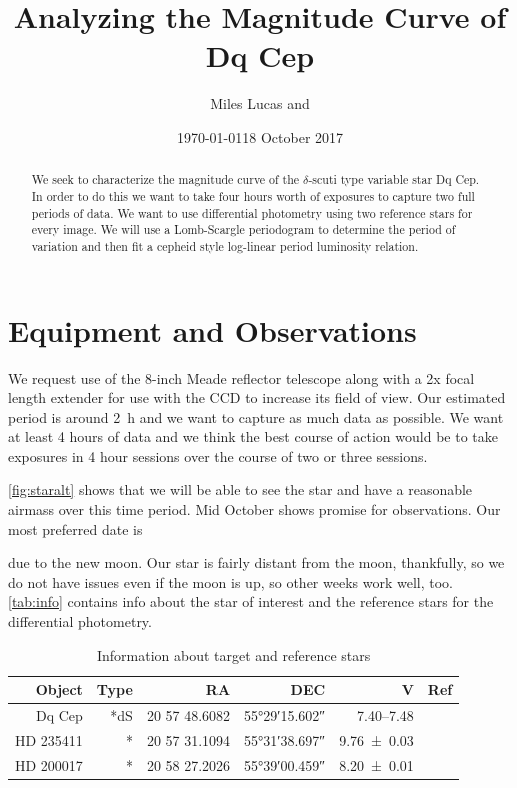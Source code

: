 \documentclass[]{article}
\title{Analyzing the Magnitude Curve of Dq Cep}
\author{Miles Lucas and }
\date{\today}
\begin{document}
\maketitle


\begin{abstract}
	We seek to characterize the magnitude curve of the $\delta$-scuti type variable star Dq Cep. In order to do this we want to take four hours worth of exposures to capture two full periods of data. We want to use differential photometry using two reference stars for every image. We will use a Lomb-Scargle periodogram to determine the period of variation and then fit a cepheid style log-linear period luminosity relation.
\end{abstract}

\section{Equipment and Observations}
	We request use of the 8-inch Meade reflector telescope along with a 2x focal length extender for use with the CCD to increase its field of view. Our estimated period is around \SI{2}{\hour} and we want to capture as much data as possible. We want at least 4 hours of data and we think the best course of action would be to take exposures in 4 hour sessions over the course of two or three sessions. 
	
	\autoref{fig:staralt} shows that we will be able to see the star and have a reasonable airmass over this time period. Mid October shows promise for observations. Our most preferred date is \date{18 October 2017} due to the new moon. Our star is fairly distant from the moon, thankfully, so we do not have issues even if the moon is up, so other weeks work well, too. \autoref{tab:info} contains info about the star of interest and the reference stars for the differential photometry.
	\begin{table}[]
		\centering
		\caption{Information about target and reference stars}
		\begin{tabular}{rrrrrr}
			\hline
			Object & Type &            RA &                DEC &                      V &                        Ref \\ \hline\hline
			Dq Cep &  *dS & 20 57 48.6082 & \ang{55;29;15.602} & \SIrange{7.40}{7.48}{} & \autocite{1971GCVS3.C......0K} \\
			HD 235411 &    * & 20 57 31.1094 & \ang{55;31;38.697} &     \SI{9.76\pm0.03}{} &  \autocite{2000AA...355L..27H} \\
			HD 200017 &    * & 20 58 27.2026 & \ang{55;39;00.459} &     \SI{8.20\pm0.01}{} &  \autocite{2000AA...355L..27H} \\ \hline
		\end{tabular}
		\label{tab:info}
	\end{table}
\end{document}
